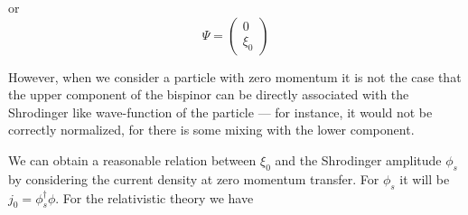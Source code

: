 or
\[
	\Psi = \begin{pmatrix} 0 \\ \xi_0 \end{pmatrix}
\]

However, when we consider a particle with zero momentum it is not the case that the upper component of the bispinor can be directly associated with the Shrodinger like wave-function of the particle --- for instance, it would not be correctly normalized, for there is some mixing with the lower component.

We can obtain a reasonable relation between $\xi_0$ and the Shrodinger amplitude $\phi_s$ by considering the current density at zero momentum transfer.  For $\phi_s$ it will be $j_0 = \phi_s^\dagger \phi$.  For the relativistic theory we have









